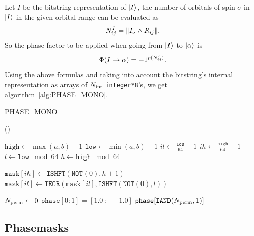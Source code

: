 \documentclass[./thesis.tex]{subfiles}
\begin{document}
Let $I$ be the bitstring representation of ${\ket{I}}$, the number of orbitals of spin $\sigma$ in ${\ket{I}}$ in the given orbital range can be evaluated as
\begin{equation}
N^{I}_{ij} = \norm{I_{\sigma} \wedge R_{ij}}.
\end{equation}
So the phase factor to be applied when going from ${\ket{I}}$ to ${\ket{\alpha}}$ is 
\begin{equation}
{\Phi \qty(I \rightarrow \alpha)} = -1^{p(N^I_{ij})}.
\end{equation}
Using the above formulas and taking into account the bitstring's internal representation as arrays of ${N_\text{int}}$ \lstinline{integer*8}'s, we get algorithm~\ref{alg:PHASE_MONO}.   


\begin{algorithm}
	\caption{PHASE\_MONO}	
	\label{alg:PHASE_MONO}
	
	\Fn(){}{
		$\texttt{high} \gets \max(a,b)-1$ \;
		$\texttt{low} \gets \min(a,b)-1$ \;
		$il \gets \frac{\texttt{low}}{64} + 1$ \;
		$ih \gets \frac{\texttt{high}}{64} + 1$ \;
		$l \gets \texttt{low} \mod 64$ \;
		$h \gets \texttt{high} \mod 64$ \; 

		
		$\texttt{mask}[ih] \gets \texttt{ISHFT}(\texttt{NOT}(0), h+1)$ \;
		$\texttt{mask}[il] \gets \texttt{IEOR}(\texttt{mask}[il], \texttt{ISHFT}(\texttt{NOT}(0), l))$ \;
		
		
		${N_\text{perm}} \gets 0$ \;
                $\texttt{phase}[0:1] = [ 1.0 \;;\; -1.0 ]$ \;
                \KwRet $\texttt{phase}[\texttt{IAND}({N_\text{perm}},1)]$ \;
		}
\end{algorithm}


\subsection{Phasemasks}
\end{document}
